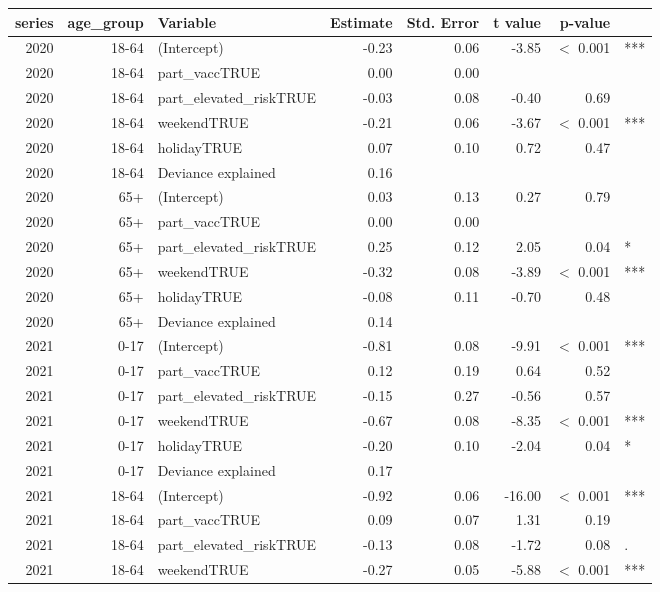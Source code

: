 \documentclass[fleqn,10pt]{wlscirep}
\begin{document}
\begin{table}[ht]
\centering
\begin{tabular}{rrlrrrrl}
  \hline
series & age\_group & Variable & Estimate & Std. Error & t value & p-value & \\ 
  \hline
  2020 & 18-64 & (Intercept) & -0.23 & 0.06 & -3.85 & $<$ 0.001 & *** \\ 
  2020 & 18-64 & part\_vaccTRUE & 0.00 & 0.00 &  &  &  \\ 
  2020 & 18-64 & part\_elevated\_riskTRUE & -0.03 & 0.08 & -0.40 & 0.69 &  \\ 
  2020 & 18-64 & weekendTRUE & -0.21 & 0.06 & -3.67 & $<$ 0.001 & *** \\ 
  2020 & 18-64 & holidayTRUE & 0.07 & 0.10 & 0.72 & 0.47 &  \\ 
  2020 & 18-64 & Deviance explained & 0.16 &  &  &  &  \\ 
  \hline
  2020 & 65+ & (Intercept) & 0.03 & 0.13 & 0.27 & 0.79 &  \\ 
  2020 & 65+ & part\_vaccTRUE & 0.00 & 0.00 &  &  &  \\ 
  2020 & 65+ & part\_elevated\_riskTRUE & 0.25 & 0.12 & 2.05 & 0.04 & * \\ 
  2020 & 65+ & weekendTRUE & -0.32 & 0.08 & -3.89 & $<$ 0.001 & *** \\ 
  2020 & 65+ & holidayTRUE & -0.08 & 0.11 & -0.70 & 0.48 &  \\ 
  2020 & 65+ & Deviance explained & 0.14 &  &  &  &  \\ 
  \hline
  2021 & 0-17 & (Intercept) & -0.81 & 0.08 & -9.91 & $<$ 0.001 & *** \\ 
  2021 & 0-17 & part\_vaccTRUE & 0.12 & 0.19 & 0.64 & 0.52 &  \\ 
  2021 & 0-17 & part\_elevated\_riskTRUE & -0.15 & 0.27 & -0.56 & 0.57 &  \\ 
  2021 & 0-17 & weekendTRUE & -0.67 & 0.08 & -8.35 & $<$ 0.001 & *** \\ 
  2021 & 0-17 & holidayTRUE & -0.20 & 0.10 & -2.04 & 0.04 & * \\ 
  2021 & 0-17 & Deviance explained & 0.17 &  &  &  &  \\ 
  \hline
  2021 & 18-64 & (Intercept) & -0.92 & 0.06 & -16.00 & $<$ 0.001 & *** \\ 
  2021 & 18-64 & part\_vaccTRUE & 0.09 & 0.07 & 1.31 & 0.19 &  \\ 
  2021 & 18-64 & part\_elevated\_riskTRUE & -0.13 & 0.08 & -1.72 & 0.08 & . \\ 
  2021 & 18-64 & weekendTRUE & -0.27 & 0.05 & -5.88 & $<$ 0.001 & *** \\ 

\end{tabular}
\end{table}
\end{document}
